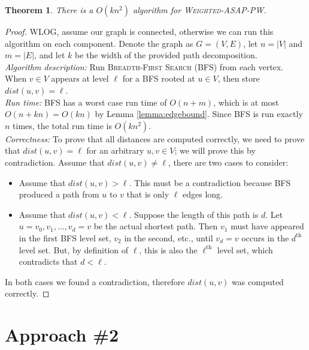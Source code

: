 \documentclass{article}
\newtheorem{theorem}{Theorem}
\begin{document}
\begin{theorem}
There is a $O(kn^2)$ algorithm for \textsc{Weighted-ASAP-PW}.
\end{theorem}

\begin{proof}
WLOG, assume our graph is connected, otherwise we can run this algorithm on each component. Denote the graph as $G = (V, E)$, let $n = |V|$ and $m = |E|$, and let $k$ be the width of the provided path decomposition. \\

\noindent \emph{Algorithm description:} Run \textsc{Breadth-First Search} (\textsc{BFS}) from each vertex. When $v \in V$ appears at level $\ell$ for a \textsc{BFS} rooted at $u \in V$, then store $dist(u, v) = \ell$. \\

\noindent \emph{Run time:} \textsc{BFS} has a worst case run time of $O(n + m)$, which is at most $O(n + kn) = O(kn)$ by Lemma \ref{lemma:edgebound}. Since \textsc{BFS} is run exactly $n$ times, the total run time is $O(kn^2)$.\\

\noindent \emph{Correctness:} To prove that all distances are computed correctly, we need to prove that $dist(u, v) = \ell$ for an arbitrary $u, v \in V$; we will prove this by contradiction. Assume that $dist(u, v) \neq \ell$, there are two cases to consider:

\begin{itemize}
\item Assume that $dist(u, v) > \ell$. This must be a contradiction because \textsc{BFS} produced a path from $u$ to $v$ that is only $\ell$ edges long.
\item Assume that $dist(u, v) < \ell$. Suppose the length of this path is $d$. Let $u = v_0, v_1, \dots, v_d = v$ be the actual shortest path. Then $v_1$ must have appeared in the first \textsc{BFS} level set, $v_2$ in the second, etc., until $v_d = v$ occurs in the $d^\text{th}$ level set. But, by definition of $\ell$, this is also the $\ell^\text{th}$ level set, which contradicts that $d < \ell$.
\end{itemize}

\noindent In both cases we found a contradiction, therefore $dist(u, v)$ was computed correctly.

\end{proof}

\newpage
\section*{Approach \#2}
\end{document}
